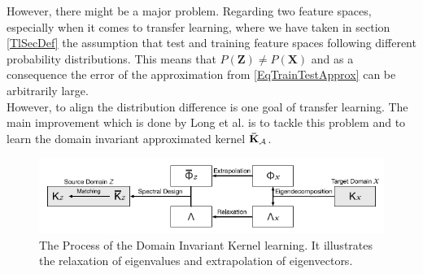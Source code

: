 However, there might be a major problem.
Regarding two feature spaces, especially when it comes to transfer learning, where we have taken in section \ref{TlSecDef} the assumption that test and training feature spaces following different probability distributions.
This means that $P(\mathbf{Z})\neq P(\mathbf{X})$ and as a consequence the error of the approximation from \eqref{EqTrainTestApprox} can be arbitrarily large.\cite{Long.2015}\\
However, to align the distribution difference is one goal of transfer learning.
The main improvement which is done by Long et al. is to tackle this problem and to learn the domain invariant approximated kernel $\mathbf{\bar{K}}_{\mathcal{A}}$.\cite{Long.2015}
\begin{figure}
	\centering
	\includegraphics[width=.8\linewidth]{figures/ProcessTKL.png}
	\caption[Tranfer Kernel Learning Process]{The Process of the Domain Invariant Kernel learning. It illustrates the relaxation of eigenvalues and extrapolation of eigenvectors. \cite{Long.2015}}
	\label{FigTKLApp}
\end{figure}
